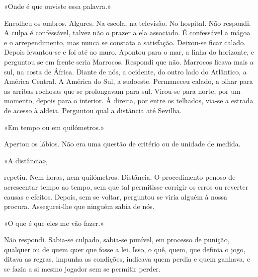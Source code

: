 «Onde é que ouviste essa palavra.»

Encolheu os ombros. Algures. Na escola, na televisão. No hospital. Não
respondi. A culpa é confessável, talvez não o prazer a ela associado. É
confessável a mágoa e o arrependimento, mas nunca se constata a
satisfação. Deixou­‑se ficar calado. Depois levantou­‑se e foi até ao
muro. Apontou para o mar, a linha do horizonte, e perguntou se em frente
seria Marrocos. Respondi que não. Marrocos ficava mais a sul, na costa
de África. Diante de nós, a ocidente, do outro lado do Atlântico, a
América Central. A América do Sul, a sudoeste. Permaneceu calado, a
olhar para as arribas rochosas que se prolongavam para sul. Virou­‑se
para norte, por um momento, depois para o interior. À direita, por entre
os telhados, via­‑se a estrada de acesso à aldeia. Perguntou qual a
distância até Sevilha.

«Em tempo ou em quilómetros.»

Apertou os lábios. Não era uma questão de critério ou de unidade de
medida.

«A distância»,

repetiu. Nem horas, nem quilómetros. Distância. O procedimento penoso de
acrescentar tempo ao tempo, sem que tal permitisse corrigir os erros ou
reverter causas e efeitos. Depois, sem se voltar, perguntou se viria
alguém à nossa procura. Assegurei­‑lhe que ninguém sabia de nós.

«O que é que eles me vão fazer.»

Não respondi. Sabia­‑se culpado, sabia­‑se punível, em processo de
punição, qualquer ou de quem quer que fosse a lei. Isso, o quê, quem,
que definia o jogo, ditava as regras, impunha as condições, indicava
quem perdia e quem ganhava, e se fazia a si mesmo jogador sem se
permitir perder.

